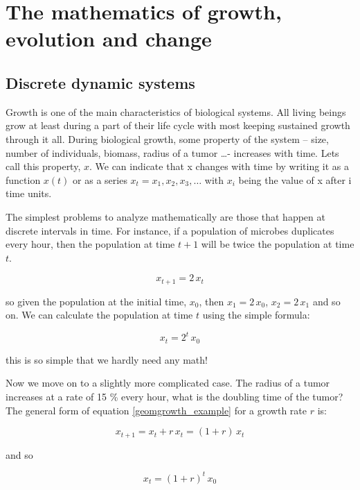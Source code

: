 \documentclass[12pt]{article}
\begin{document}
\section{The mathematics of growth, evolution and change}

\subsection{Discrete dynamic systems}

Growth is one of the main characteristics of biological systems. All living beings grow at least during a part of their life cycle with most keeping sustained growth through it all. During biological growth, some property of the system -- size, number of individuals, biomass, radius of a tumor \dots - increases with time. Lets call this property, $x$. We can indicate that x changes with time by writing it as a function $x(t)$ or as a series $x_t = x_1, x_2, x_3,\dots$ with $x_i$ being the value of x after i time units.

The simplest problems to analyze mathematically are those that happen at discrete intervals in time. For instance, if a population of microbes duplicates every hour, then the population at time $t+1$ will be twice the population at time $t$.

\begin{equation}
\label{geomgrowth_example}
x_{t+1} = 2 \, x_t
\end{equation}

so given the population at the initial time,  $x_0$, then $x_1=2\, x_0$, $x_2=2\, x_1$ and so on. We can calculate the population at time $t$ using the simple formula:

\begin{equation}
x_{t} = 2^t \, x_0
\end{equation}

this is so simple that we hardly need any math!

Now we move on to a slightly more complicated case. The radius of a tumor increases at a rate of  15 \% every hour, what is the doubling time of the tumor? The general form of equation \ref{geomgrowth_example} for a growth rate $r$ is:

\begin{equation}
\label{geomgrowth_general}
x_{t+1} = x_t  + r \, x_t =(1 + r) \, x_t
\end{equation}

and so

\begin{equation}
\label{geomgrowth_general2}
x_{t} = (1 + r)^{t} \, x_0
\end{equation}
\end{document}
